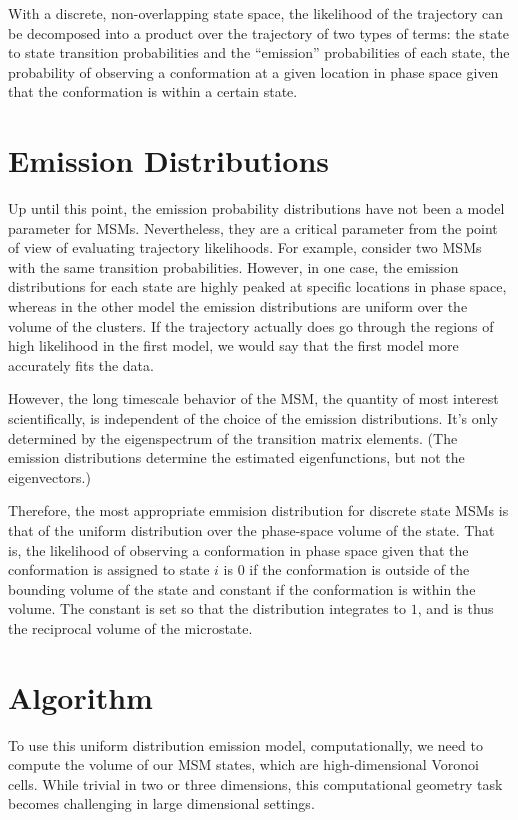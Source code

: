 \documentclass[twocolumn,floatfix,nofootinbib,aps]{revtex4-1}
\begin{document}
With a discrete, non-overlapping state space, the likelihood of the
trajectory can be decomposed into a product over the trajectory of two
types of terms: the state to state transition probabilities and the
``emission'' probabilities of each state, the probability of observing a
conformation at a given location in phase space given that the
conformation is within a certain state.

\section{Emission Distributions}

Up until this point, the emission probability distributions have not
been a model parameter for MSMs. Nevertheless, they are a critical
parameter from the point of view of evaluating trajectory likelihoods.
For example, consider two MSMs with the same transition probabilities.
However, in one case, the emission distributions for each state are
highly peaked at specific locations in phase space, whereas in the other
model the emission distributions are uniform over the volume of the
clusters. If the trajectory actually does go through the regions of high
likelihood in the first model, we would say that the first model more
accurately fits the data.

However, the long timescale behavior of the MSM, the quantity of most
interest scientifically, is independent of the choice of the emission
distributions. It's only determined by the eigenspectrum of the
transition matrix elements. (The emission distributions determine the
estimated eigenfunctions, but not the eigenvectors.)

Therefore, the most appropriate emmision distribution for discrete state
MSMs is that of the uniform distribution over the phase-space volume of
the state. That is, the likelihood of observing a conformation in phase
space given that the conformation is assigned to state $i$ is $0$
if the conformation is outside of the bounding volume of the state and
constant if the conformation is within the volume. The constant is set
so that the distribution integrates to $1$, and is thus the reciprocal
volume of the microstate.

\section{Algorithm}

To use this uniform distribution emission model, computationally, we
need to compute the volume of our MSM states, which are high-dimensional
Voronoi cells. While trivial in two or three dimensions, this
computational geometry task becomes challenging in large dimensional
settings.
\end{document}

